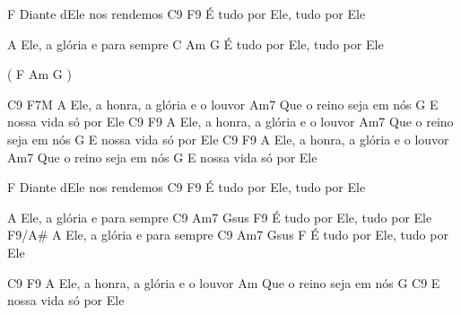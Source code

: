 \beginverse
F
  Diante dEle nos rendemos
    C9                       F9 
  É tudo por Ele, tudo por Ele

  A Ele, a glória e para sempre
    C             Am      G   
  É tudo por Ele, tudo por Ele
  
  ( F  Am  G )
\endverse

\beginverse
   C9                              F7M
  A Ele, a honra, a glória e o louvor
                      Am7
  Que o reino seja em nós
     G              
  E nossa vida só por Ele
    C9                              F9
  A Ele, a honra, a glória e o louvor
                      Am7
  Que o reino seja em nós
     G              
  E nossa vida só por Ele
    C9                              F9
  A Ele, a honra, a glória e o louvor
                      Am7
  Que o reino seja em nós
     G              
  E nossa vida só por Ele
\endverse

\beginverse
F 
  Diante dEle nos rendemos
    C9                        F9 
  É tudo por Ele, tudo por Ele

  A Ele, a glória e para sempre
     C9           Am7      Gsus   F9
  É tudo por Ele, tudo por Ele
                    F9/A#
  A Ele, a glória e para sempre
     C9            Am7       Gsus   F
  É tudo por Ele, tudo por Ele
\endverse

\beginverse
    C9                              F9
  A Ele, a honra, a glória e o louvor
                      Am
  Que o reino seja em nós
     G                          C9
  E nossa vida só por Ele

\endverse

\endsong
